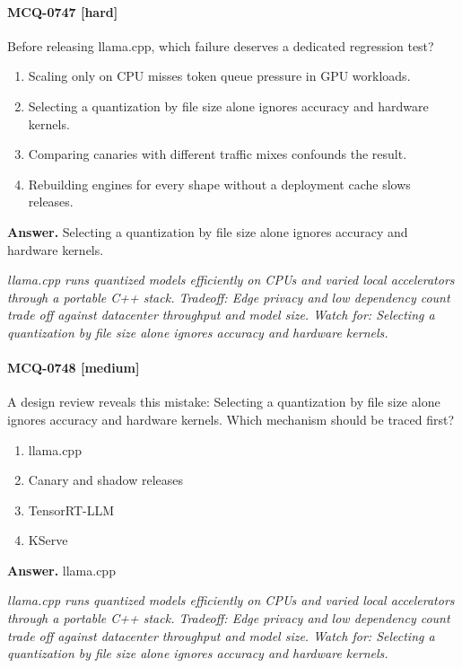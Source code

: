 \paragraph{MCQ-0747 [hard]} Before releasing llama.cpp, which failure deserves a dedicated regression test?
\begin{enumerate}[label=\Alph*.]
\item Scaling only on CPU misses token queue pressure in GPU workloads.
\item Selecting a quantization by file size alone ignores accuracy and hardware kernels.
\item Comparing canaries with different traffic mixes confounds the result.
\item Rebuilding engines for every shape without a deployment cache slows releases.
\end{enumerate}
\noindent\textbf{Answer.} Selecting a quantization by file size alone ignores accuracy and hardware kernels.
\par\textit{llama.cpp runs quantized models efficiently on CPUs and varied local accelerators through a portable C++ stack. Tradeoff: Edge privacy and low dependency count trade off against datacenter throughput and model size. Watch for: Selecting a quantization by file size alone ignores accuracy and hardware kernels.}
\paragraph{MCQ-0748 [medium]} A design review reveals this mistake: Selecting a quantization by file size alone ignores accuracy and hardware kernels. Which mechanism should be traced first?
\begin{enumerate}[label=\Alph*.]
\item llama.cpp
\item Canary and shadow releases
\item TensorRT-LLM
\item KServe
\end{enumerate}
\noindent\textbf{Answer.} llama.cpp
\par\textit{llama.cpp runs quantized models efficiently on CPUs and varied local accelerators through a portable C++ stack. Tradeoff: Edge privacy and low dependency count trade off against datacenter throughput and model size. Watch for: Selecting a quantization by file size alone ignores accuracy and hardware kernels.}
